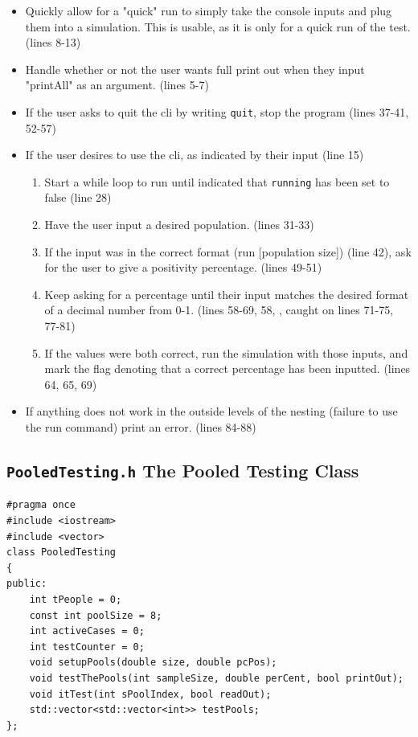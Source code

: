 \documentclass[letterpaper, 10pt]{article}
\begin{document}
\begin{itemize}
    \item Quickly allow for a "quick" run to simply take the console inputs and plug them into a simulation. This is usable, as it is only for a quick run of the test.(lines 8-13)
    \item Handle whether or not the user wants full print out when they input "printAll" as an argument. (lines 5-7)
    \item If the user asks to quit the cli by writing \texttt{quit}, stop the program (lines 37-41, 52-57)
     \item If the user desires to use the cli, as indicated by their input (line 15)
        \begin{enumerate}
            \item Start a while loop to run until indicated that \texttt{running} has been set to false (line 28)
            \item Have the user input a desired population. (lines 31-33)
            \item If the input was in the correct format (run [population size]) (line 42), ask for the user to give a positivity percentage. (lines 49-51)
            \item Keep asking for a percentage until their input matches the desired format of a decimal number from 0-1. (lines 58-69, 58, , caught on lines 71-75, 77-81)
            \item If the values were both correct, run the simulation with those inputs, and mark the flag denoting that a correct percentage has been inputted. (lines 64, 65, 69)
            \end{enumerate}
    \item If anything does not work in the outside levels of the nesting (failure to use the run command) print an error. (lines 84-88) 
\end{itemize}
 \subsection{\texttt{PooledTesting.h} The Pooled Testing Class}
 
 \begin{addmargin}[-5em]{1em}
\begin{small}
\begin{verbatim}
#pragma once
#include <iostream>
#include <vector>
class PooledTesting
{
public:
    int tPeople = 0;
    const int poolSize = 8;
    int activeCases = 0;
    int testCounter = 0;
    void setupPools(double size, double pcPos);
    void testThePools(int sampleSize, double perCent, bool printOut);
    void itTest(int sPoolIndex, bool readOut);
    std::vector<std::vector<int>> testPools;
};
\end{verbatim}
\end{small}
\end{addmargin}
\end{document}
